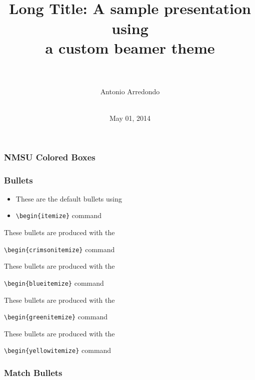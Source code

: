 \documentclass{beamer}
\title[Short Presentation Title]{~ \\ Long Title:  A sample presentation using \\ a custom beamer theme \\~}
\author[Short Author Name]{ Antonio Arredondo \\ \UniName \\ \UniDeptName}
\date{May 01, 2014}
\begin{document}
\begin{frame}
  \maketitle
\end{frame}

\begin{frame}
  \frametitle{NMSU Colored Boxes}
\end{frame}


\begin{frame}
  \frametitle{Bullets}
  \begin{itemize}
    \item These are the default bullets using
    \item \texttt{\textbackslash begin\{itemize\}} command
  \end{itemize} 

  \begin{crimsonitemize}
    \item These bullets are produced with the 
    \item \texttt{\textbackslash begin\{crimsonitemize\}} command
  \end{crimsonitemize}

  \begin{blueitemize}
    \item These bullets are produced with the 
    \item \texttt{\textbackslash begin\{blueitemize\}} command
  \end{blueitemize}

  \begin{greenitemize}
    \item These bullets are produced with the 
    \item \texttt{\textbackslash begin\{greenitemize\}} command
  \end{greenitemize}

  \begin{yellowitemize}
    \item These bullets are produced with the 
    \item \texttt{\textbackslash begin\{yellowitemize\}} command
  \end{yellowitemize}
\end{frame}


\begin{frame}
  \frametitle{Match Bullets}
\end{frame}
\end{document}
